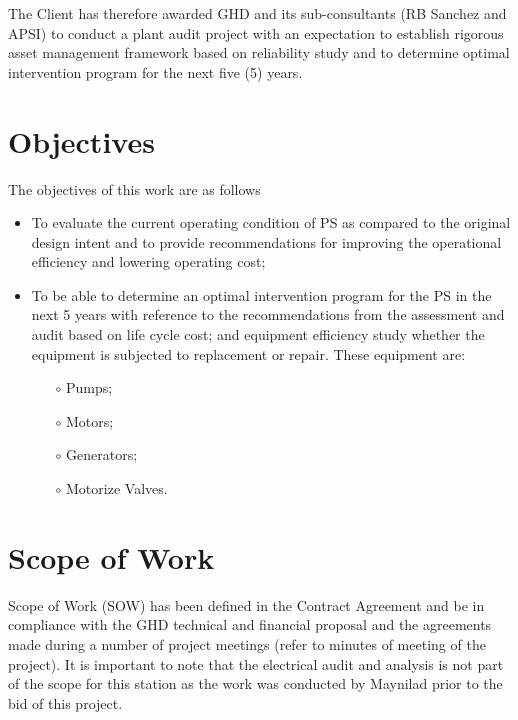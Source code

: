 The Client has therefore awarded GHD and its sub-consultants (RB Sanchez and APSI) to conduct a plant audit project with an expectation to establish rigorous asset management framework based on reliability study and to determine optimal intervention program for the next five (5) years.

\section{Objectives}
The objectives of this work are as follows
\begin{itemize}
	\item To evaluate the current operating condition of PS as compared to the original design intent and to provide recommendations for improving the operational efficiency and lowering operating cost;
	\item To be able to determine an optimal intervention program for the PS in the next 5 years with reference to the recommendations from the assessment and audit based on life cycle cost; and equipment efficiency study whether the equipment is subjected to replacement or repair. These equipment are:
	\begin{itemize}
		\item[$\circ$] Pumps;
		\item[$\circ$] Motors;
		\item[$\circ$] Generators;
		\item[$\circ$] Motorize Valves.	
	\end{itemize}
\end{itemize}

\section{Scope of Work}
Scope of Work (SOW) has been defined in the Contract Agreement and be in compliance with the GHD technical and financial proposal and the agreements made during a number of project meetings (refer to minutes of meeting of the project). It is important to note that the electrical audit and analysis is not part of the scope for this station as the work was conducted by Maynilad prior to the bid of this project.

